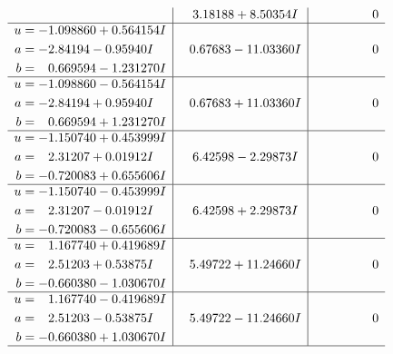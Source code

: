 \documentclass[1p]{elsarticle_modified}
\theoremstyle{definition}
\begin{document}
$$\begin{array}{c|c|c}
 & \phantom{-}3.18188 + 8.50354 I & \phantom{-0.000000 } 0 \\ \hline\begin{aligned}
u &= -1.098860 + 0.564154 I \\
a &= -2.84194 - 0.95940 I \\
b &= \phantom{-}0.669594 - 1.231270 I\end{aligned}
 & \phantom{-}0.67683 - 11.03360 I & \phantom{-0.000000 } 0 \\ \hline\begin{aligned}
u &= -1.098860 - 0.564154 I \\
a &= -2.84194 + 0.95940 I \\
b &= \phantom{-}0.669594 + 1.231270 I\end{aligned}
 & \phantom{-}0.67683 + 11.03360 I & \phantom{-0.000000 } 0 \\ \hline\begin{aligned}
u &= -1.150740 + 0.453999 I \\
a &= \phantom{-}2.31207 + 0.01912 I \\
b &= -0.720083 + 0.655606 I\end{aligned}
 & \phantom{-}6.42598 - 2.29873 I & \phantom{-0.000000 } 0 \\ \hline\begin{aligned}
u &= -1.150740 - 0.453999 I \\
a &= \phantom{-}2.31207 - 0.01912 I \\
b &= -0.720083 - 0.655606 I\end{aligned}
 & \phantom{-}6.42598 + 2.29873 I & \phantom{-0.000000 } 0 \\ \hline\begin{aligned}
u &= \phantom{-}1.167740 + 0.419689 I \\
a &= \phantom{-}2.51203 + 0.53875 I \\
b &= -0.660380 - 1.030670 I\end{aligned}
 & \phantom{-}5.49722 + 11.24660 I & \phantom{-0.000000 } 0 \\ \hline\begin{aligned}
u &= \phantom{-}1.167740 - 0.419689 I \\
a &= \phantom{-}2.51203 - 0.53875 I \\
b &= -0.660380 + 1.030670 I\end{aligned}
 & \phantom{-}5.49722 - 11.24660 I & \phantom{-0.000000 } 0\\
 \hline 
 \end{array}$$\newpage$$\begin{array}{c|c|c}  

\end{array}$$
\end{document}
